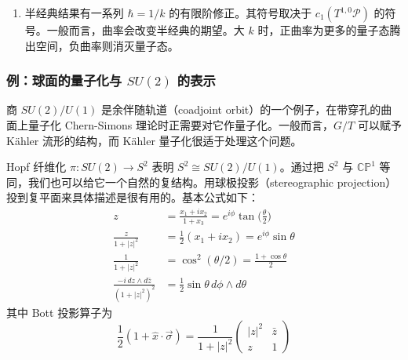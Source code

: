 \begin{enumerate}
  \item 半经典结果有一系列 $\hbar=1/k$ 的有限阶修正。其符号取决于 $c_1(T^{1,0}\mathcal{P})$ 的符号。一般而言，曲率会改变半经典的期望。大 $k$ 时，正曲率为更多的量子态腾出空间，负曲率则消灭量子态。
\end{enumerate}

\subsubsection{例：球面的量子化与 $SU(2)$ 的表示} %

商 $SU(2)/U(1)$ 是余伴随轨道（coadjoint orbit）的一个例子，在带穿孔的曲面上量子化 Chern-Simons 理论时正需要对它作量子化。一般而言，$G/T$ 可以赋予 Kähler 流形的结构，而 Kähler 量子化很适于处理这个问题。

Hopf 纤维化 $\pi:SU(2)\to S^2$ 表明 $S^2\cong SU(2)/U(1)$。通过把 $S^2$ 与 $\mathbb{CP}^1$ 等同，我们也可以给它一个自然的复结构。用球极投影（stereographic projection）投到复平面来具体描述是很有用的。基本公式如下：
\begin{equation}
  \begin{aligned}
    z&=\frac{x_1+ix_2}{1+x_3}=e^{i\phi}\tan\Big(\frac{\theta}{2}\Big)\\
    \frac{z}{1+|z|^2}&=\frac{1}{2}(x_1+ix_2)=e^{i\phi}\sin\theta\\
    \frac{1}{1+|z|^2}&=\cos^2(\theta/2)=\frac{1+\cos\theta}{2}\\
    \frac{-i\,dz\wedge d\bar z}{(1+|z|^2)^2}&=\frac{1}{2}\sin\theta\, d\phi\wedge d\theta
  \end{aligned}
  \tag{B.26}
  \label{eq:B.26}
\end{equation}
其中 Bott 投影算子为
\begin{equation}
  \frac{1}{2}(1+\hat x\cdot\vec\sigma)=\frac{1}{1+|z|^2}
  \begin{pmatrix}
    |z|^2 & \bar z\\
    z & 1
  \end{pmatrix}
  \tag{B.27}
  \label{eq:B.27}
\end{equation}

